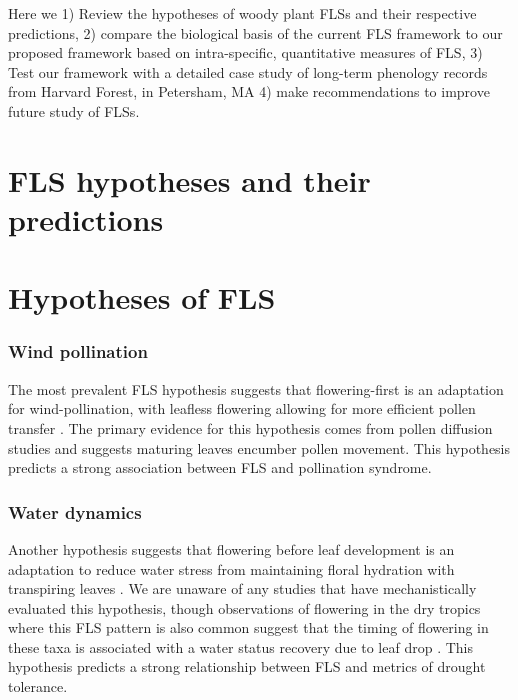 \documentclass{article}
\begin{document}
\noindent Here we 1) Review the hypotheses of woody plant FLSs and their respective predictions, 2) compare the biological basis of the current FLS framework to our proposed framework based on intra-specific, quantitative measures of FLS, 3) Test our framework with a detailed case study of long-term phenology records from Harvard Forest, in Petersham, MA 4) make recommendations to improve future study of FLSs.
\section*{FLS hypotheses and their predictions}
\section*{Hypotheses of FLS}
\subsubsection*{ Wind pollination}
\noindent The most prevalent FLS hypothesis suggests that flowering-first is an adaptation for wind-pollination, with leafless flowering allowing for more efficient pollen transfer \citep{Whitehead1969, Spurr1980,Friedman2009}. The primary evidence for this hypothesis comes from pollen diffusion studies \citep[e.g., particle movement through closed and open canopies][]{Niklas1985,Nathan2005, Milleron2012} and suggests maturing leaves encumber pollen movement. This hypothesis predicts a strong association between FLS and pollination syndrome.
\subsubsection*{Water dynamics}
\noindent Another hypothesis suggests that flowering before leaf development is an adaptation to reduce water stress from maintaining floral hydration with transpiring leaves \citep{Franklin2016}. We are unaware of any studies that have mechanistically evaluated this hypothesis, though observations of flowering in the dry tropics where this FLS pattern is also common suggest that the timing of flowering in these taxa is associated with a water status recovery due to leaf drop \citep{Borchert1983,Reich1984}. This hypothesis predicts a strong relationship between FLS and metrics of drought tolerance.
\end{document}
